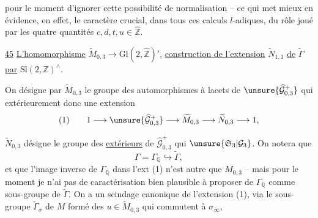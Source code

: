 
pour le moment d'ignorer cette possibilité de normalisation -- ce qui met mieux en évidence, en effet, le caractère crucial, dans tous ces calculs $l$-adiques, du rôle joué par les quatre quantités $c,d,t,u\in\widehat{\mathbb Z}$.


\uline{45} \uline{L'homomorphisme} $\widetilde M_{0,3}\longrightarrow\mathrm{Gl}(2,\widehat{\mathbb Z})'$, \uline{construction de l'extension}  $\widetilde N_{1,1}$ \uline{de} $\widetilde\Gamma$ \uline{par} $\mathrm{Sl}(2,\mathbb Z)^\wedge$.

On désigne par $\widetilde M_{0,3}$ le groupe des automorphismes  à lacets de $\unsure{\widehat{\mathcal G}_{0,3}^{+}}$ qui   extérieurement   donc une  extension
\[
(1)\qquad 1\longrightarrow\unsure{\widehat{\mathcal G}_{0,3}^{+}}\longrightarrow\widetilde M_{0,3}\longrightarrow\widetilde N_{0,3}\longrightarrow 1,
\]

$\widetilde N_{0,3}$ désigne le groupe des  \uline{extérieurs} de $\widehat{\mathcal G}_{0,3}^{+}$ qui   $\unsure{\mathfrak S_3|\mathcal G_3}$. On notera que
\[
\Gamma=\Gamma_{\mathbb Q}\hookrightarrow\widetilde\Gamma,
\]
et que l'image inverse de $\Gamma_{\mathbb Q}$ dans l'ext (1) n'est autre que $M_{0,3}$ -- mais pour le moment je n'ai pas de caractérisation bien plausible à proposer de $\Gamma_{\mathbb Q}$ comme sous-groupe de $\widetilde\Gamma$. On a un scindage canonique de l'extension (1), via le sous-groupe $\widetilde\Gamma_{\sigma}$ de $M$ formé des  $u\in\widetilde M_{0,3}$ qui commutent à $\sigma_\infty$,



